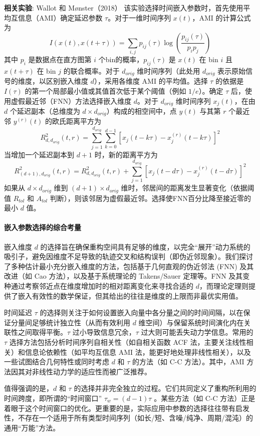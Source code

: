 \textbf{相关实验}: Wallot 和 Mønster（2018）\cite{wallot2018calculation} 该实验选择时间嵌入参数时，首先使用平均互信息（AMI）确定延迟参数 $\tau$。对于一维时间序列 $x(t)$，AMI 的计算公式为
$$I(x(t),x(t+\tau))=\sum_{i,j}p_{ij}(\tau)\log\left(\frac{p_{ij}(\tau)}{p_{i}p_{j}}\right)$$
其中 $p_i$ 是数据点在直方图第 $i$ 个bin的概率，$p_{ij}(\tau)$ 是 $x(t)$ 在 bin $i$ 且 $x(t+\tau)$ 在 bin $j$ 的联合概率。对于 $d_{orig}$ 维时间序列（此处用 $d_{orig}$ 表示原始信号的维度，以区别嵌入维度 $d$），采用各维度 AMI 的平均值。选择 $\tau$ 的依据是 $I(\tau)$ 的第一个局部最小值或其值首次低于某个阈值（例如 $1/e$）。确定 $\tau$ 后，使用虚假最近邻（FNN）方法选择嵌入维度 $d$。对于 $d_{orig}$ 维时间序列 $x_j(t)$，在由 $d$ 个延迟副本（总维度为 $d \times d_{orig}$）构成的相空间中，点 $y(t)$ 与其第 $r$ 个最近邻 $y^{(r)}(t)$ 的欧氏距离平方为
$$R_{d,d_{orig}}^{2}(t,r)=\sum_{j=1}^{d_{orig}}\sum_{k=0}^{d-1}[x_{j}(t-k\tau)-x_{j}^{(r)}(t-k\tau)]^{2}$$
当增加一个延迟副本到 $d+1$ 时，新的距离平方为
$$R_{(d+1),d_{orig}}^{2}(t,r)=R_{d,d_{orig}}^{2}(t,r)+\sum_{j=1}^{d_{orig}}[x_{j}(t-d\tau)-x_{j}^{(r)}(t-d\tau)]^{2}$$
如果从 $d \times d_{orig}$ 维到 $(d+1) \times d_{orig}$ 维时，邻居间的距离发生显著变化（依据阈值 $R_{tol}$ 和 $A_{tol}$ 判断），则该邻居为虚假最近邻。选择使FNN百分比降至接近零的最小 $d$ 值。

\paragraph{嵌入参数选择的综合考量} %
嵌入维度 $d$ 的选择旨在确保重构空间具有足够的维度，以完全“展开”动力系统的吸引子，避免因维度不足导致的轨迹交叉和结构误判（即伪近邻现象）。我们探讨了多种估计最小充分嵌入维度的方法，包括基于几何直观的伪近邻法 (FNN) 及其改进（如 Cao 方法），以及基于系统理论的 Takens/Sauer 定理等。FNN 及其变种通过考察邻近点在维度增加时的相对距离变化来寻找合适的 $d$，而理论定理则提供了嵌入有效性的数学保证，但其给出的往往是维度的上限而非最优实用值。

时间延迟 $\tau$ 的选择则关注于如何设置嵌入向量中各分量之间的时间间隔，以在保证分量间足够统计独立性（从而有效利用 $d$ 维空间）与保留系统时间演化内在关联性之间取得平衡。$\tau$ 过小导致信息冗余，$\tau$ 过大则可能丢失动力学信息。常用的 $\tau$ 选择方法包括分析时间序列自相关性（如自相关函数 ACF 法，主要关注线性相关）和信息论依赖性（如平均互信息 AMI 法，能更好地处理非线性相关），以及一些试图结合几何特性或同时考虑 $d$ 和 $\tau$ 的方法（如 C-C 方法）。其中，AMI 方法因其对非线性动力学的适应性而被广泛推荐。

值得强调的是，$d$ 和 $\tau$ 的选择并非完全独立的过程。它们共同定义了重构所利用的时间跨度，即所谓的“时间窗口” $\tau_w = (d-1)\tau$ 。某些方法（如 C-C 方法）正是着眼于这个时间窗口的优化。更重要的是，实际应用中参数的选择往往带有启发性，不存在一个适用于所有类型时间序列（如长/短、含噪/纯净、周期/混沌）的通用“万能”方法。

